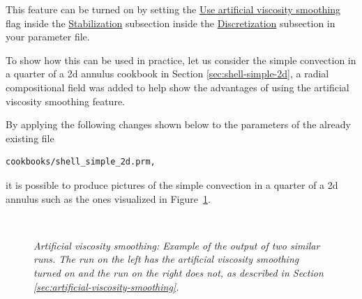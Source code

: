 \documentclass{article}
\begin{document}
This feature can be turned on by setting the \hyperref[parameters:Discretization/Stabilization parameters/Use artificial viscosity smoothing]{Use artificial viscosity smoothing} flag inside the \hyperref[parameters:Discretization/Stabilization_20parameters]{Stabilization} subsection inside the \hyperref[parameters:Discretization]{Discretization} subsection in your parameter file.

To show how this can be used in practice, let us consider the simple convection in a quarter of a 2d annulus cookbook in Section \ref{sec:shell-simple-2d}, a radial compositional field was added to help show the advantages of using the artificial viscosity smoothing feature.

By applying the following changes shown below to the parameters of the already existing file \begin{verbatim}cookbooks/shell_simple_2d.prm, \end{verbatim}

it is possible to produce pictures of the simple convection in a quarter of a 2d annulus such as the ones visualized in
Figure~\ref{fig:smoothing}.

\begin{figure}
    \centering
  ~
    \caption{\it Artificial viscosity smoothing: Example of the output of two similar runs.  The run on the left has the artificial viscosity smoothing turned on and the run on the right does not, as described in Section \ref{sec:artificial-viscosity-smoothing}.}
    \label{fig:smoothing}
\end{figure}
\end{document}
